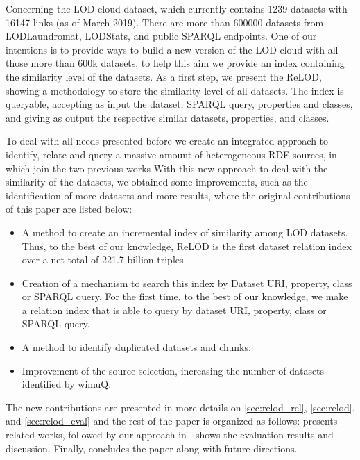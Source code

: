 \documentclass[sw]{iosart2x}
\begin{document}
Concerning the LOD-cloud dataset, which currently contains \num{1239} datasets with \num{16147} links (as of March 2019)\cite{lodcloud}. There are more than \num{600000} datasets from LODLaundromat, LODStats, and public SPARQL endpoints. One of our intentions is to provide ways to build a new version of the LOD-cloud with all those more than 600k datasets, to help this aim we provide an index containing the similarity level of the datasets. As a first step, we present the ReLOD, showing a methodology to store the similarity level of all datasets. The index is queryable, accepting as input the dataset, SPARQL query, properties and classes, and giving as output the respective similar datasets, properties, and classes.

To deal with all needs presented before we create an integrated approach to identify, relate and query a massive amount of heterogeneous RDF sources, in which join the two previous works\cite{valdestilhas2018my, valdestilhas2019more} 
With this new approach to deal with the similarity of the datasets, we obtained some improvements, such as the identification of more datasets and more results, where the original contributions of this paper are listed below:
\begin{itemize}
    \item A method to create an incremental index of similarity among LOD datasets. Thus, to the best of our knowledge, ReLOD is the first dataset relation index over a net total of 221.7 billion triples.
    \item Creation of a mechanism to search this index by Dataset URI, property, class or SPARQL query. For the first time, to the best of our knowledge, we make a relation index that is able to query by dataset URI, property, class or SPARQL query.
    \item A method to identify duplicated datasets and chunks.
    \item Improvement of the source selection, increasing the number of datasets identified by wimuQ\cite{valdestilhas2019more}.
\end{itemize}

The new contributions are presented in more details on \cref{sec:relod_rel}, \cref{sec:relod}, and \cref{sec:relod_eval} and the rest of the paper is organized as follows:
 presents related works, followed by our approach in .  shows the evaluation results and discussion. Finally,  concludes the paper along with future directions.
\end{document}
